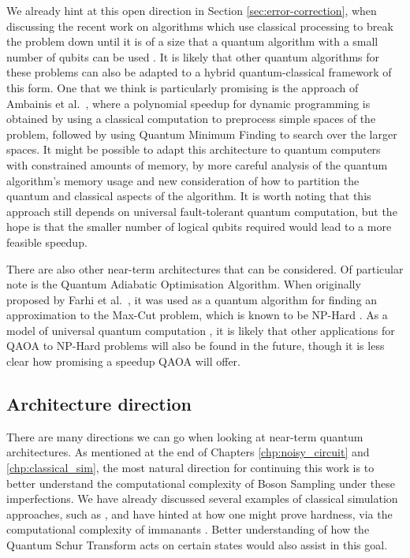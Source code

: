 We already hint at this open direction in Section \ref{sec:error-correction}, when discussing the recent work on algorithms which use classical processing to break the problem down until it is of a size that a quantum algorithm with a small number of qubits can be used \cite{dunjko2018, ge2019}. It is likely that other quantum algorithms for these problems can also be adapted to a hybrid quantum-classical framework of this form. One that we think is particularly promising is the approach of Ambainis et al.~\cite{ambainis2018}, where a polynomial speedup for dynamic programming is obtained by using a classical computation to preprocess simple spaces of the problem, followed by using Quantum Minimum Finding to search over the larger spaces. It might be possible to adapt this architecture to quantum computers with constrained amounts of memory, by more careful analysis of the quantum algorithm's memory usage and new consideration of how to partition the quantum and classical aspects of the algorithm. It is worth noting that this approach still depends on universal fault-tolerant quantum computation, but the hope is that the smaller number of logical qubits required would lead to a more feasible speedup.

There are also other near-term architectures that can be considered. Of particular note is the Quantum Adiabatic Optimisation Algorithm. When originally proposed by Farhi et al.~\cite{farhi2014}, it was used as a quantum algorithm for finding an approximation to the Max-Cut problem, which is known to be NP-Hard \cite{karp1972}. As a model of universal quantum computation \cite{lloyd2018, morales2019}, it is likely that other applications for QAOA to NP-Hard problems will also be found in the future, though it is less clear how promising a speedup QAOA will offer.

\subsection{Architecture direction}

There are many directions we can go when looking at near-term quantum architectures. As mentioned at the end of Chapters \ref{chp:noisy_circuit} and \ref{chp:classical_sim}, the most natural direction for continuing this work is to better understand the computational complexity of Boson Sampling under these imperfections. We have already discussed several examples of classical simulation approaches, such as \cite{renema2018, renema2018loss, garciapatron2017, oszmaniec2018, brod2019}, and have hinted at how one might prove hardness, via the computational complexity of immanants \cite{hartmann1985, barvinok1990, burgisser2000, burgisser2000immanants, mertens2013}. Better understanding of how the Quantum Schur Transform acts on certain states would also assist in this goal.

